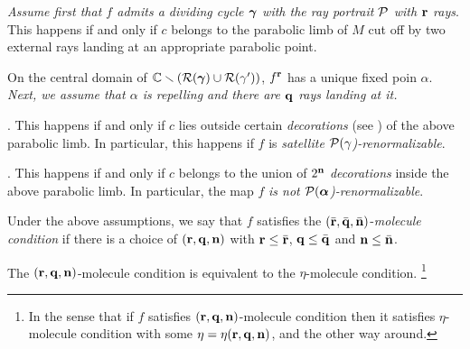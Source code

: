 \ssk
{\it Assume first that $f$ admits a dividing cycle ${\mbox{\boldmath$\gamma$} }$ with the ray portrait ${\mathcal P}$
with ${\mathbf{r}}$ rays}. 
This happens if and only if $c$ belongs to the parabolic limb of $M$ cut off by
two external rays landing at an appropriate parabolic point. 

\ssk
On the central domain of ${\mathbb C}\smallsetminus ({\mathcal R}({\mbox{\boldmath$\gamma$} })\cup {\mathcal R}(\gamma'))$,
$f^{\mathbf{r}}$ has a unique fixed poin $\alpha$. 
{\it Next, we assume that $\alpha$ is repelling and there are ${\mathbf{q}}$ rays landing at it.} 

.
       This happens if and only if 
  $c$ lies outside certain {\it decorations} (see \cite{decorations})
  of the above parabolic limb. In particular, this happens if $f$ is
  {\it satellite  ${\mathcal P}(\gamma$)-renormalizable}.   

. 
   This happens if and only if 
  $c$ belongs to the union  of $2^{\mathbf{n}}$ {\it decorations} 
  inside the above parabolic limb. In particular, the map $f$ 
  {\it is not  ${\mathcal P}({\mbox{\boldmath$\alpha$} }$)-renormalizable}.   

\ssk 
 Under the above assumptions, 
  we say that $f$ satisfies the $(\bar{{\mathbf{r}}}, \bar{{\mathbf{q}}}, \bar{{\mathbf{n}}})$-{\it molecule condition} if
  there is a choice of $({\mathbf{r}}, {\mathbf{q}},{\mathbf{n}})$ with ${\mathbf{r}}\leq \bar{{\mathbf{r}}}$, ${\mathbf{q}}\leq \bar {{\mathbf{q}}}$ and ${\mathbf{n}}\leq \bar {{\mathbf{n}}}$.  


\begin{lem}
     The $({\mathbf{r}},{\mathbf{q}},{\mathbf{n}})$-molecule condition is equivalent to the $\eta$-molecule condition.%
\footnote{In the sense that if $f$ satisfies $({\mathbf{r}},{\mathbf{q}},{\mathbf{n}})$-molecule condition then it satisfies
 $\eta$-molecule condition with some $\eta=\eta({\mathbf{r}},{\mathbf{q}},{\mathbf{n}})$, and the other way around.}  
\end{lem}

